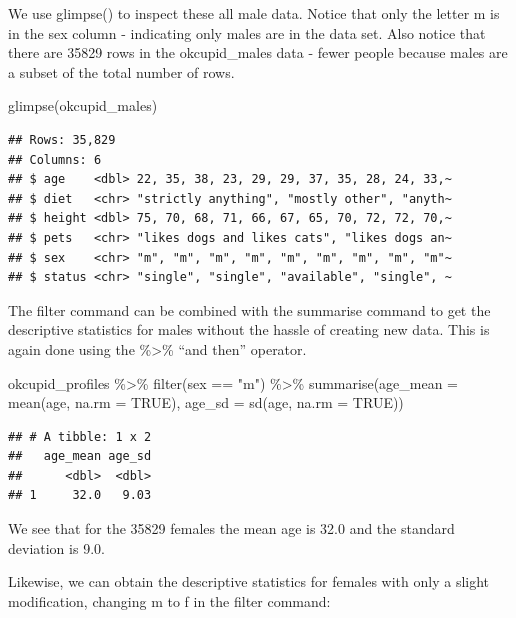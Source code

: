 \documentclass[
]{krantz}
\makeatletter
\newenvironment{Shaded}{\begin{snugshade}}{\end{snugshade}}
\newcommand{\AttributeTok}[1]{\textcolor[rgb]{0.61,0.61,0.61}{#1}}
\newcommand{\ConstantTok}[1]{\textcolor[rgb]{0,0,0}{#1}}
\newcommand{\FunctionTok}[1]{\textcolor[rgb]{0,0,0}{#1}}
\newcommand{\NormalTok}[1]{#1}
\newcommand{\SpecialCharTok}[1]{\textcolor[rgb]{0,0,0}{#1}}
\newcommand{\StringTok}[1]{\textcolor[rgb]{0.5,0.5,0.5}{#1}}
\newenvironment{kframe}{%
\medskip{}
\setlength{\fboxsep}{.8em}
 \def\at@end@of@kframe{}%
 \ifinner\ifhmode%
  \def\at@end@of@kframe{\end{minipage}}%
  \begin{minipage}{\columnwidth}%
 \fi\fi%
 \def\FrameCommand##1{\hskip\@totalleftmargin \hskip-\fboxsep
 \colorbox{shadecolor}{##1}\hskip-\fboxsep
     \hskip-\linewidth \hskip-\@totalleftmargin \hskip\columnwidth}%
 \MakeFramed {\advance\hsize-\width
   \@totalleftmargin\z@ \linewidth\hsize
   \@setminipage}}%
 {\par\unskip\endMakeFramed%
 \at@end@of@kframe}
\renewenvironment{Shaded}{\begin{kframe}}{\end{kframe}}
\makeatother
\begin{document}
We use glimpse() to inspect these all male data. Notice that only the letter m is in the sex column - indicating only males are in the data set. Also notice that there are 35829 rows in the okcupid\_males data - fewer people because males are a subset of the total number of rows.

\begin{Shaded}
\begin{Highlighting}[]
\FunctionTok{glimpse}\NormalTok{(okcupid\_males)}
\end{Highlighting}
\end{Shaded}

\begin{verbatim}
## Rows: 35,829
## Columns: 6
## $ age    <dbl> 22, 35, 38, 23, 29, 29, 37, 35, 28, 24, 33,~
## $ diet   <chr> "strictly anything", "mostly other", "anyth~
## $ height <dbl> 75, 70, 68, 71, 66, 67, 65, 70, 72, 72, 70,~
## $ pets   <chr> "likes dogs and likes cats", "likes dogs an~
## $ sex    <chr> "m", "m", "m", "m", "m", "m", "m", "m", "m"~
## $ status <chr> "single", "single", "available", "single", ~
\end{verbatim}

The filter command can be combined with the summarise command to get the descriptive statistics for males without the hassle of creating new data. This is again done using the \%\textgreater\% ``and then'' operator.

\begin{Shaded}
\begin{Highlighting}[]
\NormalTok{okcupid\_profiles }\SpecialCharTok{\%\textgreater{}\%}
  \FunctionTok{filter}\NormalTok{(sex }\SpecialCharTok{==} \StringTok{"m"}\NormalTok{) }\SpecialCharTok{\%\textgreater{}\%}
  \FunctionTok{summarise}\NormalTok{(}\AttributeTok{age\_mean =} \FunctionTok{mean}\NormalTok{(age, }\AttributeTok{na.rm =} \ConstantTok{TRUE}\NormalTok{),}
            \AttributeTok{age\_sd =} \FunctionTok{sd}\NormalTok{(age, }\AttributeTok{na.rm =} \ConstantTok{TRUE}\NormalTok{))}
\end{Highlighting}
\end{Shaded}

\begin{verbatim}
## # A tibble: 1 x 2
##   age_mean age_sd
##      <dbl>  <dbl>
## 1     32.0   9.03
\end{verbatim}

We see that for the 35829 females the mean age is 32.0 and the standard deviation is 9.0.

Likewise, we can obtain the descriptive statistics for females with only a slight modification, changing m to f in the filter command:
\end{document}
